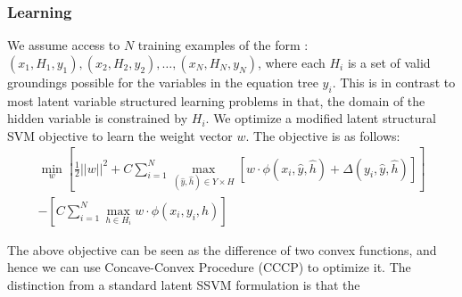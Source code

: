     \subsubsection{Learning}
      We assume access to $N$ training examples of the form : $(x_1,
      H_1, y_1), (x_2, H_2, y_2), \ldots, (x_N, H_N, y_N)$, where each
      $H_i$ is a set of valid groundings possible for the variables in
      the equation tree $y_i$. This is in contrast to most latent
      variable structured learning problems in that, the domain of the
      hidden variable is constrained by $H_i$. We optimize a modified
      latent structural SVM objective to learn the weight vector
      $w$. The objective is as follows:
      \begin{multline}
        \min_w \left[ \frac{1}{2}||w||^2
          + C\sum_{i=1}^N \max_{(\hat{y}, \hat{h})\in Y \times H}
          \left[w\cdot \phi(x_i, \hat{y}, \hat{h}) 
            + \Delta(y_i, \hat{y}, \hat{h}) \right] \right] \\
        - \left[ C\sum_{i=1}^N \max_{h \in H_i} 
          w \cdot \phi(x_i, y_i, h) \right]
      \end{multline}  

      The above objective can be seen as the difference of two convex
      functions, and hence we can use Concave-Convex Procedure (CCCP)
      to optimize it. The distinction from a standard latent SSVM formulation 
      is that the 




    
    





